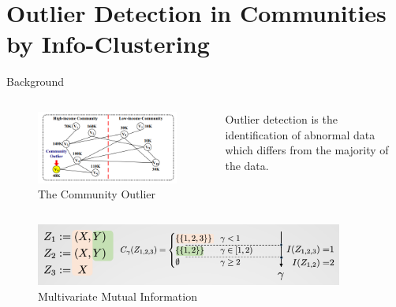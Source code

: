 \documentclass[notheorems]{beamer}
\begin{document}
\section[Info-Clustering]{Outlier Detection in Communities by Info-Clustering}
\begin{frame}
	\tableofcontents[currentsection]
\end{frame}
\begin{frame}{Background}
	\begin{columns}
		\column{5cm}
		\begin{figure}
			\includegraphics[width=\textwidth]{community_outlier.png}
			\caption{The Community Outlier}
		\end{figure}
		\column{5cm}
		Outlier detection is the identification of abnormal data which differs from the majority of the data.
	\end{columns}
\begin{figure}
\includegraphics[width=0.9\textwidth]{mmi.png}
\caption{Multivariate Mutual Information}
\end{figure}
\end{frame}
\end{document}
